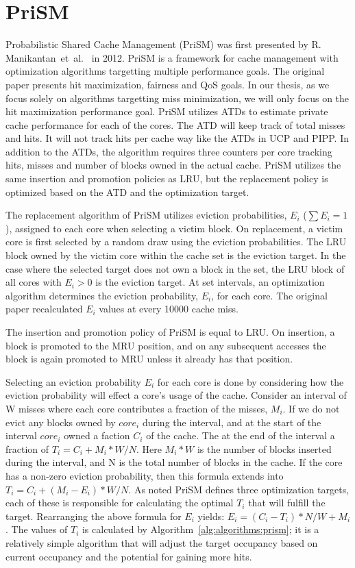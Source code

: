 \section{PriSM}
\label{sec:algorithms:prism}

Probabilistic Shared Cache Management (PriSM) was first presented by R. Manikantan~et~al.~\cite{Manikantan2012} in 2012.
PriSM is a framework for cache management with optimization algorithms targetting multiple performance goals.
The original paper presents hit maximization, fairness and QoS goals.
In our thesis, as we focus solely on algorithms targetting miss minimization, we will only focus on the hit maximization performance goal.
PriSM utilizes ATDs to estimate private cache performance for each of the cores.
The ATD will keep track of total misses and hits.
It will not track hits per cache way like the ATDs in UCP and PIPP.
In addition to the ATDs, the algorithm requires three counters per core tracking hits, misses and number of blocks owned in the actual cache.
PriSM utilizes the same insertion and promotion policies as LRU, but the replacement policy is optimized based on the ATD and the optimization target.

The replacement algorithm of PriSM utilizes eviction probabilities, $E_i$ ($\sum{E_i} = 1$), assigned to each core when selecting a victim block.
On replacement, a victim core is first selected by a random draw using the eviction probabilities.
The LRU block owned by the victim core within the cache set is the eviction target.
In the case where the selected target does not own a block in the set, the LRU block of all cores with $E_i > 0$ is the eviction target.
At set intervals, an optimization algorithm determines the eviction probability, $E_i$, for each core.
The original paper recalculated $E_i$ values at every 10000 cache miss.

The insertion and promotion policy of PriSM is equal to LRU.
On insertion, a block is promoted to the MRU position, and on any subsequent accesses the block is again promoted to MRU unless it already has that position.

Selecting an eviction probability $E_i$ for each core is done by considering how the eviction probability will effect a core's usage of the cache.
Consider an interval of W misses where each core contributes a fraction of the misses, $M_i$.
If we do not evict any blocks owned by $core_i$ during the interval, and at the start of the interval $core_i$ owned a faction $C_i$ of the cache.
The at the end of the interval a fraction of $T_i = C_i + M_i * W/N$. 
Here $M_i * W$ is the number of blocks inserted during the interval, and N is the total number of blocks in the cache.
If the core has a non-zero eviction probability, then this formula extends into $T_i = C_i + (M_i - E_i) * W/N$.
As noted PriSM defines three optimization targets, each of these is responsible for calculating the optimal $T_i$ that will fulfill the target.
Rearranging the above formula for $E_i$ yields: $E_i = (C_i - T_i) * N/W + M_i$.
The values of $T_i$ is calculated by Algorithm~\ref{alg:algorithms:prism}; it is a relatively simple algorithm that will adjust the target occupancy based on current occupancy and the potential for gaining more hits.

